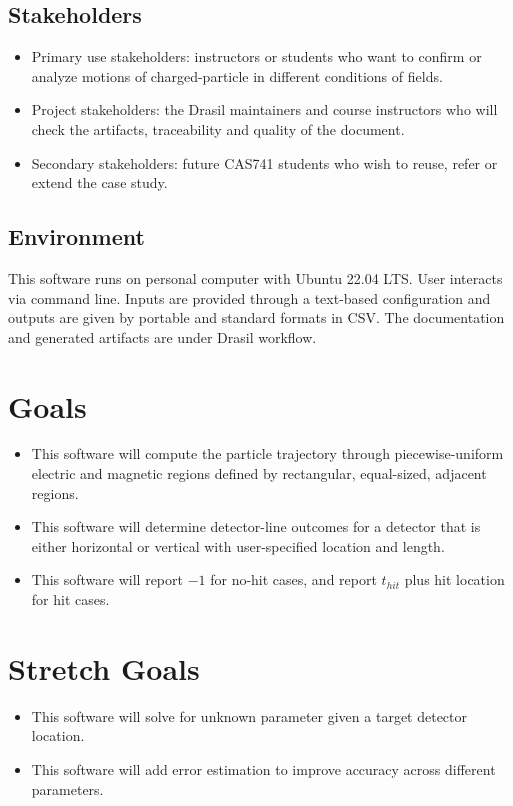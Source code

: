 \documentclass{article}
\begin{document}
\subsection{Stakeholders}
\begin{itemize}
\item Primary use stakeholders: instructors or students who want to confirm or analyze motions of charged-particle in different conditions of fields.
\item Project stakeholders: the Drasil maintainers and course instructors who will check the artifacts, traceability and quality of the document.
\item Secondary stakeholders: future CAS741 students who wish to reuse, refer or extend the case study.
\end{itemize}

\subsection{Environment}

This software runs on personal computer with Ubuntu 22.04 LTS. User interacts via command line. Inputs are provided through a text-based configuration and outputs are given by portable and standard formats in CSV. The documentation and generated artifacts are under Drasil workflow.

\section{Goals}
\begin{itemize}
\item This software will compute the particle trajectory through piecewise-uniform electric and magnetic regions defined by rectangular, equal-sized, adjacent regions.
\item This software will determine detector-line outcomes for a detector that is either horizontal or vertical with user-specified location and length.
\item This software will report $-1$ for no-hit cases, and report $t_{hit}$ plus hit location for hit cases.
\end{itemize}

\section{Stretch Goals}
\begin{itemize}
\item This software will solve for unknown parameter given a target detector location.
\item This software will add error estimation to improve accuracy across different parameters.
\end{itemize}
\end{document}
